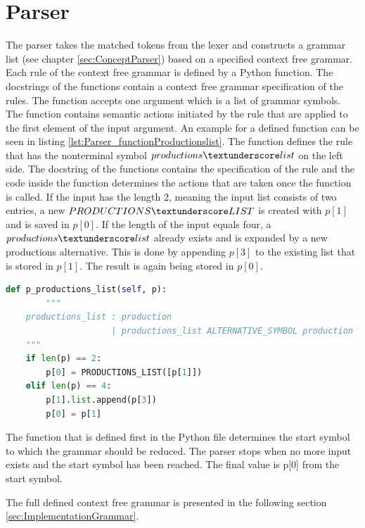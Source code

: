 \section{Parser}\label{sec:ImplementationParser}
The parser takes the matched tokens from the lexer and constructs a grammar list (see chapter \ref{sec:ConceptParser}) based on a specified context free grammar. Each rule of the context free grammar is defined by a Python function. The docstrings of the functions contain a context free grammar specification of the rules. The function accepts one argument which is a list of grammar symbols. The function contains semantic actions initiated by the rule that are applied to the first element of the input argument.
An example for a defined function can be seen in listing \ref{lst:Parser_functionProductionslist}. The function defines the rule that has the nonterminal symbol $productions\textunderscore list$ on the left side. The docstring of the functions contains the specification of the rule and the code inside the function determines the actions that are taken once the function is called. If the input has the length 2, meaning the input list consists of two entries, a new $PRODUCTIONS\textunderscore LIST$ is created with $p[1]$ and is saved in $p[0]$. If the length of the input equals four, a $productions\textunderscore list$ already exists and is expanded by a new productions alternative. This is done by appending $p[3]$ to the existing list that is stored in $p[1]$. The result is again being stored in $p[0]$. \\

\begin{lstlisting}[language=Python,basicstyle=\scriptsize	,caption= Parser function of productions list,label= lst:Parser_functionProductionslist]
def p_productions_list(self, p):
		"""
    productions_list : production
                     | productions_list ALTERNATIVE_SYMBOL production
    """
    if len(p) == 2:
    	p[0] = PRODUCTIONS_LIST([p[1]])
    elif len(p) == 4:
        p[1].list.append(p[3])
        p[0] = p[1]
\end{lstlisting}

The function that is defined first in the Python file determines the start symbol to which the grammar should be reduced. The parser stops when no more input exists and the start symbol has been reached. The final value is p[0] from the start symbol. 

The full defined context free grammar is presented in the following section \ref{sec:ImplementationGrammar}.

